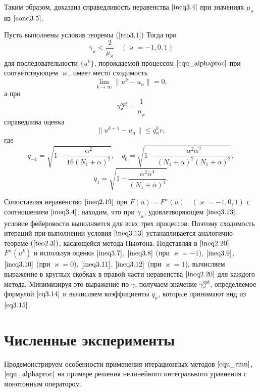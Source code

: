 Таким образом, доказана справедливость неравенства $\eqref{ineq3.4}$ при значениях $\mu_\varkappa$ из $\eqref{cond3.5}$.
\begin{theorem}\label{teo3.2}
	Пусть выполнены условия теоремы $(\ref{teo3.1})$ Тогда при
	\begin{equation}\label{ineq3.13}
	\gamma _\varkappa <\frac{2}{\mu _\varkappa}\quad (\varkappa=-1,0,1)
	\end{equation}
	для последовательности $\{u^k\}$, порождаемой процессом $\eqref{equ_alphaproc}$ при соответствующем $\varkappa$, имеет место сходимость $$\lim_{k\to\infty}\|u^k-u_\alpha\|=0,$$ а при 
	\begin{equation}\label{eq3.14}
	\gamma{_\varkappa^{opt}}=\frac{1}{\mu_\varkappa}
	\end{equation}
	справедлива оценка $$\|u^{k+1}-u_\alpha\|\le q{_\varkappa^k}r,$$ где
	$$q_{-1}=\sqrt{1-\frac{\alpha^2}{16(N_1+\alpha)^2}}, \quad q_0=\sqrt{1-\frac{\alpha^2\bar\alpha^2}{(N_1+\alpha)^2(N_1+\bar\alpha)^2}},$$
	\begin{equation}\label{eq3.15}
	q_1=\sqrt{1-\frac{\alpha^2\bar\alpha^4}{(N_1+\bar\alpha)^4}}.
	\end{equation}
\end{theorem}
\proof Сопоставляя неравенство $\eqref{ineq2.19}$ при $F(u)=F^\varkappa(u) \quad (\varkappa=-1,0,1)$ с соотношением $\eqref{ineq3.4}$, находим, что при $\gamma_\varkappa$, удовлетворяющем  $\eqref{ineq3.13}$, условие фейеровости выполняется для всех трех процессов. Поэтому сходимость итераций при выполнении условия $\eqref{ineq3.13}$ устанавливается аналогично теореме $(\ref{teo2.3})$, касающейся метода Ньютона. Подставляя в $\eqref{ineq2.20}$ $F^\varkappa(u^k)$ и используя оценки $\eqref{ineq3.7}$, $\eqref{ineq3.8}$ (при $\varkappa=-1$), $\eqref{ineq3.9}$, $\eqref{ineq3.10}$ (при $\varkappa=0$), $\eqref{ineq3.11}$, $\eqref{ineq3.12}$ (при $\varkappa=1$), вычисляем выражение в круглых скобках в правой части неравенства $\eqref{ineq2.20}$ для каждого метода. Минимизируя это выражение по $\gamma$, получаем значение $\gamma{_\varkappa^{opt}}$, определяемое формулой $\eqref{eq3.14}$ и вычисляем коэффициенты $q_\varkappa$, которые принимают вид из $\eqref{eq3.15}$.

\newpage
\section{Численные эксперименты}

Продемонстрируем особенности применения итерационных методов $\eqref{equ_rmn}$, $\eqref{equ_alphaproc}$ на примере решения нелинейного интегрального уравнения с монотонным оператором.

